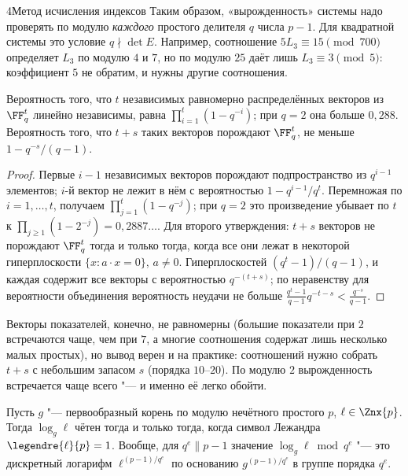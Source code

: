 \begin{lecture}{4}{Метод исчисления индексов}
Таким образом, «вырожденность» системы надо проверять по модулю \emph{каждого} простого
делителя $q$ числа $p - 1$. Для квадратной системы это условие $q \nmid \det E$. Например,
соотношение $5 L_3 \equiv 15 \pmod{700}$ определяет $L_3$ по модулю $4$ и $7$, но по модулю $25$
даёт лишь $L_3 \equiv 3 \pmod 5$: коэффициент $5$ не обратим, и нужны другие соотношения.

\begin{proposition}\label{l4:random-rank}
Вероятность того, что $t$ независимых равномерно распределённых векторов из $\FF_q^t$ линейно
независимы, равна $\prod_{i=1}^{t}(1 - q^{-i})$; при $q = 2$ она больше $0{,}288$.
Вероятность того, что $t + s$ таких векторов порождают $\FF_q^t$, не меньше $1 - q^{-s}/(q - 1)$.
\end{proposition}

\begin{proof}
Первые $i - 1$ независимых векторов порождают подпространство из $q^{i-1}$ элементов; $i$-й
вектор не лежит в нём с вероятностью $1 - q^{i-1}/q^t$. Перемножая по $i = 1, \dots, t$, получаем
$\prod_{j=1}^{t}(1 - q^{-j})$; при $q = 2$ это произведение убывает по $t$ к
$\prod_{j \ge 1}(1 - 2^{-j}) = 0{,}2887\ldots$. Для второго утверждения: $t + s$ векторов
не порождают $\FF_q^t$ тогда и только тогда, когда все они лежат в некоторой гиперплоскости
$\{x : a \cdot x = 0\}$, $a \ne 0$. Гиперплоскостей $(q^t - 1)/(q - 1)$, и каждая содержит все
векторы с вероятностью $q^{-(t+s)}$; по неравенству для вероятности объединения вероятность
неудачи не больше $\frac{q^t - 1}{q - 1} q^{-t-s} < \frac{q^{-s}}{q - 1}$.
\end{proof}

Векторы показателей, конечно, не равномерны (большие показатели при $2$ встречаются чаще, чем
при $7$, а многие соотношения содержат лишь несколько малых простых), но вывод верен и на
практике: соотношений нужно собрать $t + s$ с небольшим запасом $s$ (порядка $10$--$20$).
По модулю $2$ вырожденность встречается чаще всего "--- и именно её легко обойти.

\begin{proposition}\label{l4:parity}
Пусть $g$ "--- первообразный корень по модулю нечётного простого $p$, $\ell \in \Znx{p}$. Тогда
$\log_g \ell$ чётен тогда и только тогда, когда символ Лежандра $\legendre{\ell}{p} = 1$.
Вообще, для $q^e \parallel p - 1$ значение $\log_g \ell \bmod q^e$ "--- это дискретный логарифм
$\ell^{(p-1)/q^e}$ по основанию $g^{(p-1)/q^e}$ в группе порядка $q^e$.
\end{proposition}


\end{lecture}

